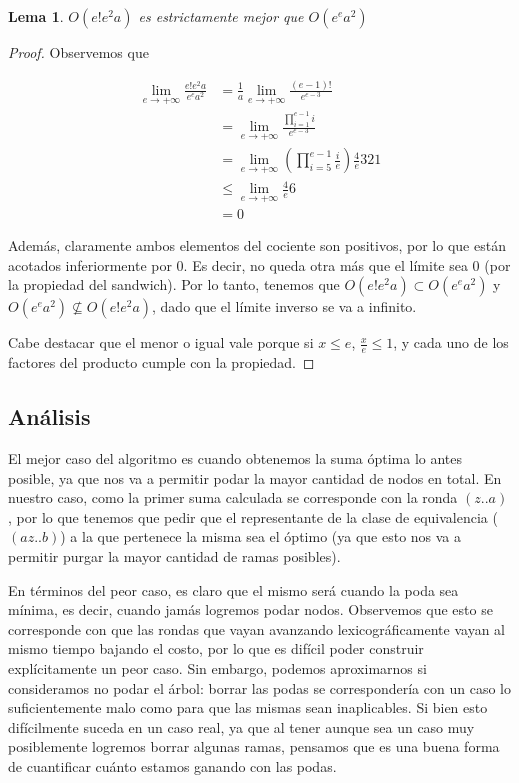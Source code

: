 \documentclass{article}
\newtheorem{lemma}{Lema}[theorem]
\theoremstyle{definition}
\theoremstyle{remark}
\begin{document}
\begin{lemma}
$O(e! e^2 a)$ es estrictamente mejor que $O(e^e a^2)$
\end{lemma}

\begin{proof}
Observemos que

\begin{equation}
\begin{aligned}
\lim_{e \to +\infty} \frac{e! e^2 a}{e^e a^2} &= \frac{1}{a} \lim_{e \to +\infty} \frac{(e-1)!}{e^{e-3}} \\
&= \lim_{e \to +\infty} \frac{\prod_{i=1}^{e-1} i}{e^{e-3}} \\
&= \lim_{e \to +\infty} (\prod_{i=5}^{e-1} \frac{i}{e}) \frac{4}{e} 3 2 1 \\
&\leq \lim_{e \to +\infty} \frac{4}{e} 6 \\
&= 0
\end{aligned}
\end{equation}

Además, claramente ambos elementos del cociente son positivos, por lo que están acotados inferiormente por 0. Es decir, no queda otra más que el límite sea 0 (por la propiedad del sandwich). Por lo tanto, tenemos que $O(e! e^2 a) \subset O(e^e a^2)$ y $O(e^e a^2) \nsubseteq O(e! e^2 a)$, dado que el límite inverso se va a infinito.

Cabe destacar que el menor o igual vale porque si $x \leq e$, $\frac{x}{e} \leq 1$, y cada uno de los factores del producto cumple con la propiedad.
\end{proof}

\subsection{Análisis}

El mejor caso del algoritmo es cuando obtenemos la suma óptima lo antes posible, ya que nos va a permitir podar la mayor cantidad de nodos en total. En nuestro caso, como la primer suma calculada se corresponde con la ronda $(z..a)$, por lo que tenemos que pedir que el representante de la clase de equivalencia ($(a z .. b)$) a la que pertenece la misma sea el óptimo (ya que esto nos va a permitir purgar la mayor cantidad de ramas posibles).

En términos del peor caso, es claro que el mismo será cuando la poda sea mínima, es decir, cuando jamás logremos podar nodos. Observemos que esto se corresponde con que las rondas que vayan avanzando lexicográficamente vayan al mismo tiempo bajando el costo, por lo que es difícil poder construir explícitamente un peor caso. Sin embargo, podemos aproximarnos si consideramos no podar el árbol: borrar las podas se correspondería con un caso lo suficientemente malo como para que las mismas sean inaplicables. Si bien esto difícilmente suceda en un caso real, ya que al tener aunque sea un caso muy posiblemente logremos borrar algunas ramas, pensamos que es una buena forma de cuantificar cuánto estamos ganando con las podas.
\end{document}
